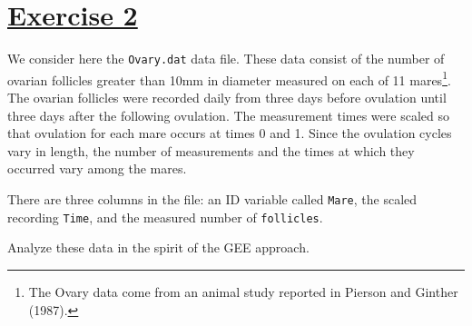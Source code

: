 \documentclass[a4paper,12pt]{article}\usepackage[]{graphicx}\usepackage[]{color}
\begin{document}
\section{\underline{Exercise 2}}

We consider here the \texttt{Ovary.dat} data file. These data consist of the number of ovarian follicles greater than 10mm in diameter measured on each of 11 mares\footnote{The Ovary data come from an animal study reported in Pierson and Ginther (1987).}. The ovarian follicles were recorded daily from three days before ovulation until three days after the following ovulation. The measurement times were scaled so that ovulation for each mare occurs at times 0 and 1. Since the ovulation cycles vary in length, the number of measurements and the times at which they occurred vary among the mares.

There are three columns in the file: an ID variable called \verb"Mare", the scaled recording \verb"Time", and the measured number of \verb"follicles".

Analyze these data in the spirit of the GEE approach.
\end{document}
